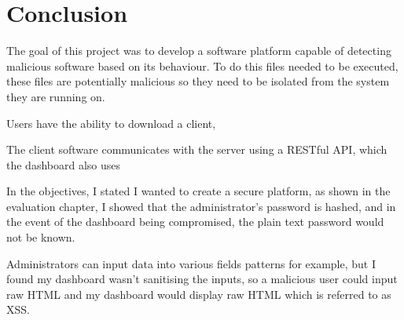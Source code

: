 \chapter{Conclusion}

The goal of this project was to develop a software platform capable of
detecting malicious software based on its behaviour.
To do this files needed to be executed, these files are potentially malicious
so they need to be isolated from the system they are running on.

Users have the ability to download a client, 

The client software communicates with the server using a RESTful API, which the dashboard also uses

In the objectives, I stated I wanted to create a secure platform, as shown in the evaluation chapter, I showed that the administrator's password is hashed, and in the event of the dashboard being compromised, the plain text password would not be known.

Administrators can input data into various fields patterns for example, but I found my dashboard wasn't sanitising the inputs, so a malicious user could input raw HTML and my dashboard would display raw HTML which is referred to as XSS.

